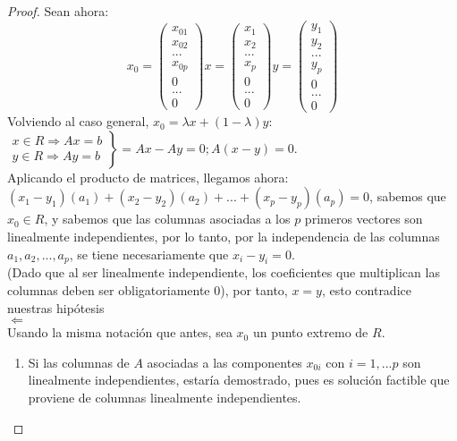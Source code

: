 \documentclass[11pt,fleqn]{book} %
\begin{document}
\begin{proof}
  Sean ahora:
  $$x_0=\left(\begin{array}{c}
	x_{01} \\
	x_{02} \\
	... \\
	x_{0p} \\
	0 \\
	... \\
	0
  \end{array}\right) x=\left(\begin{array}{c}
	x_{1} \\
	x_{2} \\
	... \\
	x_{p} \\
	0 \\
	... \\
	0
  \end{array}\right) y=\left(\begin{array}{c}
	y_{1} \\
	y_{2} \\
	... \\
	y_{p} \\
	0 \\
	... \\
	0
  \end{array}\right)$$
  Volviendo al caso general, $x_0=\lambda x + (1-\lambda)y$: \\
  $\left.\begin{array}{c}
	x \in R \Rightarrow Ax=b \\
	y \in R \Rightarrow Ay=b
  \end{array}\right\}=Ax-Ay=0; A(x-y)=0$. \\
  Aplicando el producto de matrices, llegamos ahora:\\ $(x_1-y_1)(a_1)+(x_2-y_2)(a_2)+...+(x_p-y_p)(a_p)=0$, sabemos que $x_0 \in R$, y sabemos que las columnas asociadas a los $p$ primeros vectores son linealmente independientes, por lo tanto, por la independencia de las columnas $a_1, a_2, ..., a_p$, se tiene necesariamente que $x_i-y_i=0$. \\(Dado que al ser linealmente independiente, los coeficientes que multiplican las columnas deben ser obligatoriamente 0), por tanto, $x=y$, esto contradice nuestras hipótesis \\
  $\Leftarrow$ \\
  Usando la misma notación que antes, sea $x_0$ un punto extremo de $R$.
  \begin{enumerate}
  \item Si las columnas de $A$ asociadas a las componentes $x_{0i}$ con $i=1,...p$ son linealmente independientes, estaría demostrado, pues es solución factible que proviene de columnas linealmente independientes.

\end{enumerate}
\end{proof}
\end{document}
